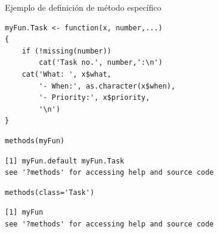 \documentclass[xcolor={usenames,svgnames,dvipsnames}]{beamer}
\begin{document}
\begin{frame}[label={sec:orga8120af},fragile]{Ejemplo de definición de método específico}
 \lstset{language=r,label= ,caption= ,captionpos=b,numbers=none}
\begin{lstlisting}
myFun.Task <- function(x, number,...)
{
    if (!missing(number))
        cat('Task no.', number,':\n')
    cat('What: ', x$what,
        '- When:', as.character(x$when),
        '- Priority:', x$priority,
        '\n')
}
\end{lstlisting}

\lstset{language=r,label= ,caption= ,captionpos=b,numbers=none}
\begin{lstlisting}
methods(myFun)
\end{lstlisting}

\begin{verbatim}
[1] myFun.default myFun.Task   
see '?methods' for accessing help and source code
\end{verbatim}


\lstset{language=r,label= ,caption= ,captionpos=b,numbers=none}
\begin{lstlisting}
methods(class='Task')
\end{lstlisting}

\begin{verbatim}
[1] myFun
see '?methods' for accessing help and source code
\end{verbatim}
\end{frame}
\end{document}
